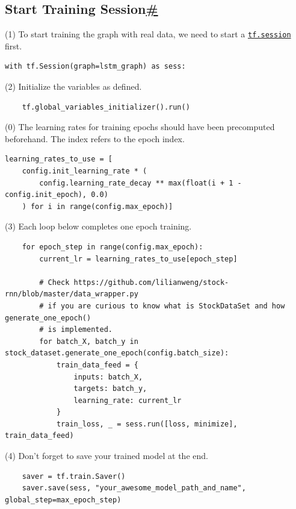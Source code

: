 \subsection{\texorpdfstring{Start Training Session\hyperref[start-training-session]{\#}}{Start Training Session\#}}\label{start-training-session}

(1) To start training the graph with real data, we need to start a \href{https://www.tensorflow.org/api_docs/python/tf/Session}{\texttt{tf.session}} first.

\begin{verbatim}
with tf.Session(graph=lstm_graph) as sess:
\end{verbatim}

(2) Initialize the variables as defined.

\begin{verbatim}
    tf.global_variables_initializer().run()
\end{verbatim}

(0) The learning rates for training epochs should have been precomputed beforehand. The index refers to the epoch index.

\begin{verbatim}
learning_rates_to_use = [
    config.init_learning_rate * (
        config.learning_rate_decay ** max(float(i + 1 - config.init_epoch), 0.0)
    ) for i in range(config.max_epoch)]
\end{verbatim}

(3) Each loop below completes one epoch training.

\begin{verbatim}
    for epoch_step in range(config.max_epoch):
        current_lr = learning_rates_to_use[epoch_step]
        
        # Check https://github.com/lilianweng/stock-rnn/blob/master/data_wrapper.py
        # if you are curious to know what is StockDataSet and how generate_one_epoch() 
        # is implemented.
        for batch_X, batch_y in stock_dataset.generate_one_epoch(config.batch_size):
            train_data_feed = {
                inputs: batch_X, 
                targets: batch_y, 
                learning_rate: current_lr
            }
            train_loss, _ = sess.run([loss, minimize], train_data_feed)
\end{verbatim}

(4) Don't forget to save your trained model at the end.

\begin{verbatim}
    saver = tf.train.Saver()
    saver.save(sess, "your_awesome_model_path_and_name", global_step=max_epoch_step)
\end{verbatim}

